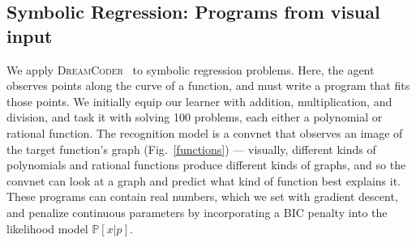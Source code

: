 \documentclass{article}
\newcommand{\system}{\textsc{DreamCoder}~}
\newcommand{\probability}{\mathds{P}} %
\begin{document}
\subsection{Symbolic Regression: Programs from visual input}\label{regressionSection}
We apply \system
to symbolic regression problems.  Here, the
agent observes points along the curve of a function, and must write a
program that fits those points.  We initially equip our learner with
addition, multiplication, and division, and task it with solving
100 %
problems, each either a polynomial or rational function.  The recognition model is a
convnet that observes an image of the target function's
graph (Fig.~\ref{functions}) --- visually, different kinds of
polynomials and rational functions produce different kinds of graphs,
and so the convnet can  look at a graph and predict
what kind of function best explains it.
These programs can contain real numbers,
which we set with gradient descent,
and penalize continuous parameters by
incorporating a BIC penalty into the likelihood model $\probability[x|p]$.
\end{document}
